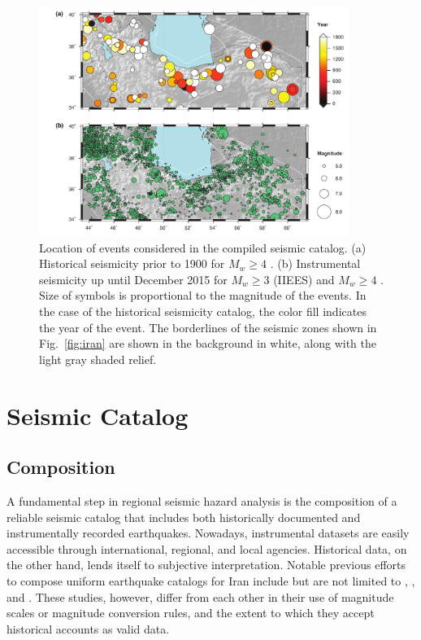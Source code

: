 
\begin{figure}[t] 
	\centering
	\includegraphics[width=0.9\textwidth]{figures/pdf/figure-03}
	\caption{Location of events considered in the compiled seismic catalog. (a) Historical seismicity prior to 1900 for $M_w \geq 4$ \citep[after][]{Zare2014}. (b) Instrumental seismicity up until December 2015 for $M_w \geq 3$ (IIEES) and $M_w \geq 4$ \citep[after][]{Zare2014}. Size of symbols is proportional to the magnitude of the events. In the case of the historical seismicity catalog, the color fill indicates the year of the event. The borderlines of the seismic zones shown in Fig.~\ref{fig:iran} are shown in the background in white, along with the light gray shaded relief.}
	\label{fig:catalog}
\end{figure}

\section{Seismic Catalog}

\subsection{Composition}

A fundamental step in regional seismic hazard analysis is the composition of a reliable seismic catalog that includes both historically documented and instrumentally recorded earthquakes. Nowadays, instrumental datasets are easily accessible through international, regional, and local agencies. Historical data, on the other hand, lends itself to subjective interpretation. Notable previous efforts to compose uniform earthquake catalogs for Iran include but are not limited to \citet{Ambraseys_1982_Book}, \citet{moinfar1994}, and \citet{Berberian_1995_Tech}. These studies, however, differ from each other in their use of magnitude scales or magnitude conversion rules, and the extent to which they accept historical accounts as valid data. 


